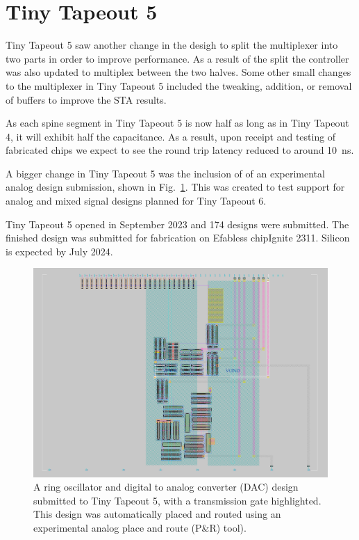\section{Tiny Tapeout 5}
\label{sec:tinytapeout5}

Tiny Tapeout 5 saw another change in the desigh to split the multiplexer into two parts in order to improve performance. As a result of the split the controller was also updated to multiplex between the two halves.
Some other small changes to the multiplexer in Tiny Tapeout 5 included the tweaking, addition, or removal of buffers to improve the STA results.

As each spine segment in Tiny Tapeout 5 is now half as long as in Tiny Tapeout 4, it will exhibit half the capacitance. As a result, upon receipt and testing of fabricated chips we expect to see the round trip latency reduced to around \qty{10}{\ns}.

A bigger change in Tiny Tapeout 5 was the inclusion of of an experimental analog design submission, shown in Fig.~\ref{fig:transmission_gate_TT05}.  This was created to test support for analog and mixed signal designs planned for Tiny Tapeout 6.

Tiny Tapeout 5 opened in September 2023 and 174 designs were submitted. 
The finished design was submitted for fabrication on Efabless chipIgnite 2311. Silicon is expected by July 2024.

\begin{figure}[!t]
\centering
\includegraphics[width=\columnwidth]{./Figs/tt05_transmission_gate.png}
\caption{A ring oscillator and digital to analog converter (DAC) design submitted to Tiny Tapeout 5, with a transmission gate highlighted. This design was automatically placed and routed using an experimental analog place and route (P\&R) tool).}
\label{fig:transmission_gate_TT05}
\end{figure}

